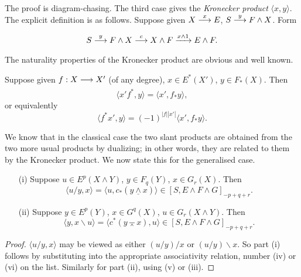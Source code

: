 \documentclass[../main]{subfiles}
\begin{document}
The proof is diagram-chasing. The third case gives the \emph{Kronecker product}  $\langle x, y\rangle$. The explicit definition is as follows. Suppose given $X \lar{x} E$, $S \lar{y} F \wedge X$. Form \[S \lar{y} F \wedge X \lar{c} X \wedge F \lar{x \wedge 1} E \wedge F.\] The naturality properties of the Kronecker product are obvious and well known. 

\begin{proposition}\label{prop:p3ch09.6}
Suppose given $f : X \lar{} X'$ (of any degree), $x \in E^\ast(X')$, $y \in F_\ast(X)$. Then \[\langle x'f^\ast, y\rangle = \langle x', f_\ast y\rangle,\] or equivalently \[\langle f^\ast x', y\rangle = (-1)^{|f| |x'|} \langle x', f_\ast y\rangle.\] 
\end{proposition}

We know that in the classical case the two slant products are obtained from the two more usual products by dualizing; in other words, they are related to them by the Kronecker product. We now state this for the generalised case.

\begin{proposition}\label{prop:p3ch09.7}
\begin{enumerate}
    \item[(i)] Suppose $u \in E^p(X \wedge Y)$, $y \in F_q(Y)$, $x \in G_r(X)$. Then \[\langle u/y, x\rangle = \langle u, c_\ast(y \underline \wedge x)\rangle \in [S, E \wedge F \wedge G]_{-p + q + r}.\]
    \item[(ii)] Suppose $y \in E^p(Y)$, $x \in G^q(X)$, $u \in G_r(X \wedge Y)$. Then \[\langle y, x \backslash u\rangle = \langle c^\ast(y \barwedge x), u\rangle \in [S, E \wedge F \wedge G]_{-p + q + r}.\]
\end{enumerate}
\end{proposition}

\begin{proof}
$\langle u/y, x\rangle$ may be viewed as either $(u/y)/x$ or $(u/y) \backslash x$. So part (i) follows by substituting into the appropriate associativity relation, number (iv) or (vi) on the list. Similarly for part (ii), using (v) or (iii). 
\end{proof}
\end{document}
